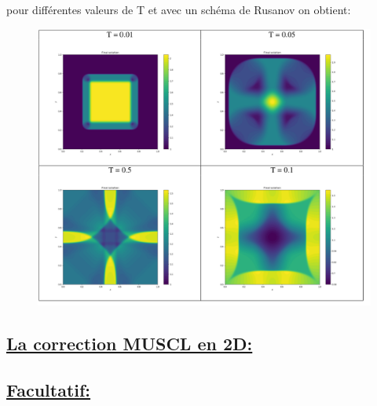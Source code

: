 pour diff\'erentes valeurs de T et avec un sch\'ema de Rusanov on obtient:
\begin{figure}[h!]
	\centering \includegraphics[scale=0.5]{Images_Fichiers/2D.png}
\end{figure}


\subsection[La correction MUSCL en 2D]{\uline{La correction MUSCL en 2D:}}

\subsection[Facultatif]{\uline{Facultatif:}}
















